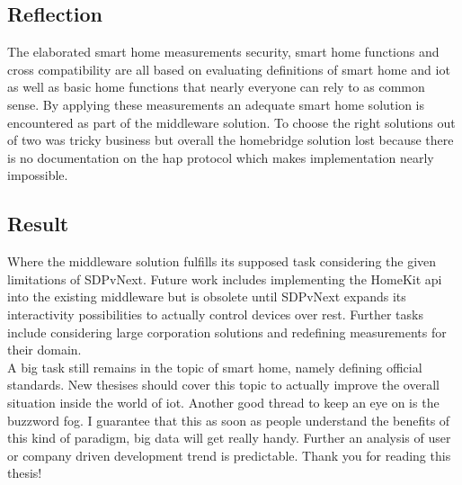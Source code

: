 \subsection{Reflection}

	The elaborated smart home measurements security, smart home functions and cross compatibility are all based on evaluating definitions of smart home and iot as well as basic home functions that nearly everyone can rely to as common sense. By applying these measurements an adequate smart home solution is encountered as part of the middleware solution. To choose the right solutions out of two was tricky business but overall the homebridge solution lost because there is no documentation on the hap protocol which makes implementation nearly impossible.


\subsection{Result}
	Where the middleware solution fulfills its supposed task considering the given limitations of SDPvNext. Future work includes implementing the HomeKit api into the existing middleware but is obsolete until SDPvNext expands its interactivity possibilities to actually control devices over rest. Further tasks include considering large corporation solutions and redefining measurements for their domain.\\

	A big task still remains in the topic of smart home, namely defining official standards. New thesises should cover this topic to actually improve the overall situation inside the world of iot. Another good thread to keep an eye on is the buzzword fog. I guarantee that this as soon as people understand the benefits of this kind of paradigm, big data will get really handy. Further an analysis of user or company driven development trend is predictable. Thank you for reading this thesis!




